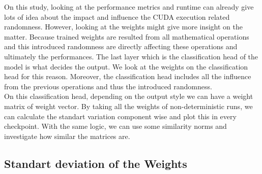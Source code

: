 On this study,  looking at the performance metrics and runtime can already give lots of idea about the impact and influence the CUDA execution related randomness. However, looking at the weights might give more insight on the matter. Because trained weights are resulted from all mathematical operations and this introduced randomness are directly affecting these operations and ultimately the performances. 
The last layer which is the classification head of the model is what decides the output. We look at the weights on the classification head for this reason. Moreover, the classification head includes all the influence from the previous operations and thus the introduced randomness.\\

On this classification head, depending on the output style we can have a weight matrix of weight vector. By taking all the weights of non-deterministic runs, we can calculate the standart variation component wise and plot this in every checkpoint. With the same logic, we can use some similarity norms and investigate how similar the matrices are.\\

\subsection{Standart deviation of the Weights}


